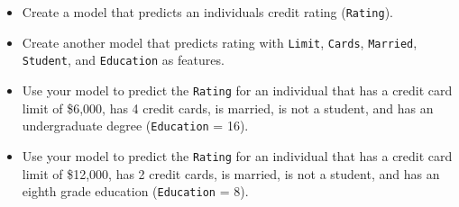 \documentclass[
]{article}
\begin{document}
\begin{itemize}
\item
  Create a model that predicts an individuals credit rating (\texttt{Rating}).
\item
  Create another model that predicts rating with \texttt{Limit}, \texttt{Cards}, \texttt{Married}, \texttt{Student}, and \texttt{Education} as features.
\item
  Use your model to predict the \texttt{Rating} for an individual that has a credit card limit of
  \$6,000, has 4 credit cards, is married, is not a student, and has an undergraduate degree (\texttt{Education} = 16).
\item
  Use your model to predict the \texttt{Rating} for an individual that has a credit card limit of
  \$12,000, has 2 credit cards, is married, is not a student, and has an eighth grade education (\texttt{Education} = 8).
\end{itemize}
\end{document}
